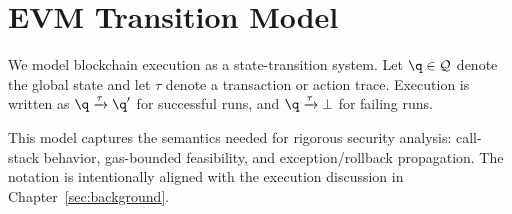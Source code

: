 \section{EVM Transition Model}

We model blockchain execution as a state-transition system.
Let $\q \in \mathcal{Q}$ denote the global state and let $\tau$ denote a transaction or action trace.
Execution is written as $\q \xrightarrow{\tau} \q'$ for successful runs, and $\q \xrightarrow{\tau} \bot$ for failing runs.

This model captures the semantics needed for rigorous security analysis:
call-stack behavior, gas-bounded feasibility, and exception/rollback propagation.
The notation is intentionally aligned with the execution discussion in Chapter~\ref{sec:background}.
